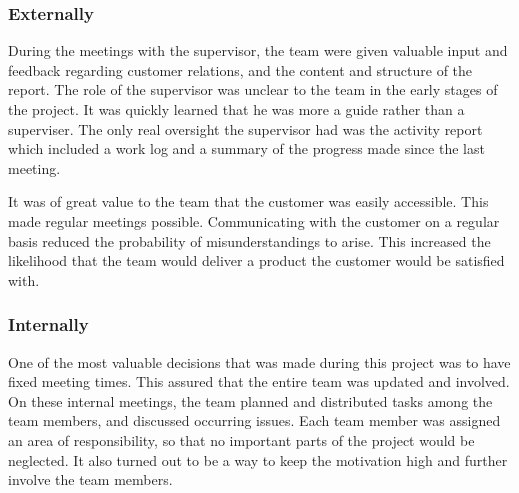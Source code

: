 \subsubsection{Externally}
During the meetings with the supervisor, the team were given valuable input and feedback regarding customer relations, and the content and structure of the report. The role of the supervisor was unclear to the team in the early stages of the project. It was quickly learned that he was more a guide rather than a superviser. The only real oversight the supervisor had was the activity report which included a work log and a summary of the progress made since the last meeting.

It was of great value to the team that the customer was easily accessible. This made regular meetings possible. Communicating with the customer on a regular basis reduced the probability of misunderstandings to arise. This increased the likelihood that the team would deliver a product the customer would be satisfied with.
 
\subsubsection{Internally}
One of the most valuable decisions that was made during this project was to have fixed meeting times. This assured that the entire team was updated and involved. On these internal meetings, the team planned and distributed tasks among the team members, and discussed occurring issues. Each team member was assigned an area of responsibility, so that no important parts of the project would be neglected. It also turned out to be a way to keep the motivation high and further involve the team members.

